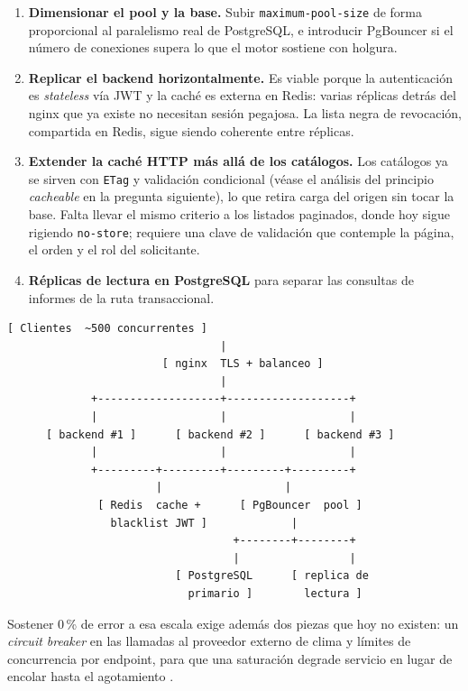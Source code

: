 \documentclass[12pt,a4paper]{article}
\begin{document}
\begin{enumerate}
  \item \textbf{Dimensionar el pool y la base.} Subir \texttt{maximum-pool-size} de forma
        proporcional al paralelismo real de PostgreSQL, e introducir PgBouncer si el número de
        conexiones supera lo que el motor sostiene con holgura.
  \item \textbf{Replicar el backend horizontalmente.} Es viable porque la autenticación es
        \textit{stateless} vía JWT y la caché es externa en Redis: varias réplicas detrás del
        nginx que ya existe no necesitan sesión pegajosa. La lista negra de revocación,
        compartida en Redis, sigue siendo coherente entre réplicas.
  \item \textbf{Extender la caché HTTP más allá de los catálogos.} Los catálogos ya se sirven
        con \texttt{ETag} y validación condicional (véase el análisis del principio
        \textit{cacheable} en la pregunta siguiente), lo que retira carga del origen sin tocar la
        base. Falta llevar el mismo criterio a los listados paginados, donde hoy sigue rigiendo
        \texttt{no-store}; requiere una clave de validación que contemple la página, el orden y
        el rol del solicitante.
  \item \textbf{Réplicas de lectura en PostgreSQL} para separar las consultas de informes de la
        ruta transaccional.
\end{enumerate}

\begin{lstlisting}[style=bash, caption={Arquitectura escalada propuesta}]
                    [ Clientes  ~500 concurrentes ]
                                 |
                        [ nginx  TLS + balanceo ]
                                 |
             +-------------------+-------------------+
             |                   |                   |
      [ backend #1 ]      [ backend #2 ]      [ backend #3 ]
             |                   |                   |
             +---------+---------+---------+---------+
                       |                   |
              [ Redis  cache +      [ PgBouncer  pool ]
                blacklist JWT ]             |
                                   +--------+--------+
                                   |                 |
                          [ PostgreSQL      [ replica de
                            primario ]        lectura ]
\end{lstlisting}

Sostener 0\,\% de error a esa escala exige además dos piezas que hoy no existen: un
\textit{circuit breaker} en las llamadas al proveedor externo de clima y límites de
concurrencia por endpoint, para que una saturación degrade servicio en lugar de encolar hasta el
agotamiento \parencite{nygard2018}.
\end{document}
